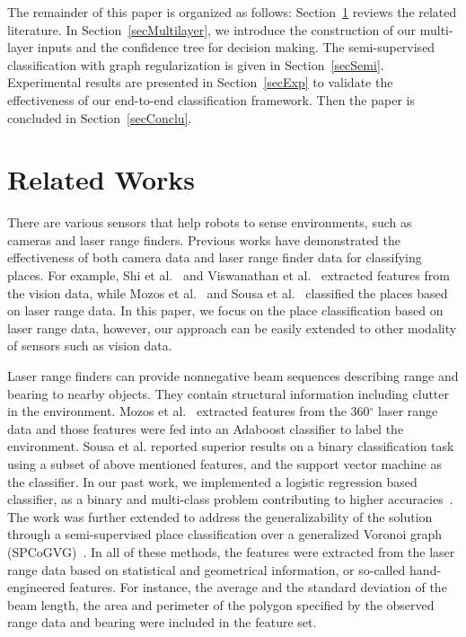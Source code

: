 \documentclass[letterpaper, 10 pt, conference]{ieeeconf}  %
\begin{document}
The remainder of this paper is organized as follows: Section~\ref{secRelated} reviews the related literature. In Section~\ref{secMultilayer}, we introduce the construction of our multi-layer inputs and the confidence tree for decision making. The semi-supervised classification with graph regularization is given in Section~\ref{secSemi}. Experimental results are presented in Section~\ref{secExp} to validate the effectiveness of our end-to-end classification framework. Then the paper is concluded in Section~\ref{secConclu}.

\section{Related Works} \label{secRelated}

There are various sensors that help robots to sense environments, such as cameras and laser range finders. Previous works have demonstrated the effectiveness of both camera data and laser range finder data for classifying places. For example, Shi et al.~\cite{shi2006investigating} and Viswanathan et al.~\cite{viswanathan2009automated} extracted features from the vision data, while Mozos et al.~\cite{mozos2005supervised} and Sousa et al.~\cite{sousa2007real} classified the places based on laser range data. In this paper, we focus on the place classification based on laser range data, however, our approach can be easily extended to other modality of sensors such as vision data.

Laser range finders can provide nonnegative beam sequences describing range and bearing to nearby objects. They contain structural information including clutter in the environment. Mozos et al.~\cite{mozos2005supervised} extracted features from the 360$^\circ$ laser range data and those features were fed into an Adaboost classifier to label the environment. Sousa et al. \cite{sousa2007real} reported superior results on a binary classification task using a subset of above mentioned features, and the support vector machine as the classifier. In our past work, we implemented a logistic regression based classifier, as a binary and multi-class problem contributing to higher accuracies~\cite{shi2010laser,shi2010multi}. The work was further extended to address the generalizability of the solution through a semi-supervised place classification over a generalized Voronoi graph (SPCoGVG)~\cite{shi2013towards}. In all of these methods, the features were extracted from the laser range data based on statistical and geometrical information, or so-called hand-engineered features. For instance, the average and the standard deviation of the beam length, the area and perimeter of the polygon specified by the observed range data and bearing were included in the feature set.
\end{document}
